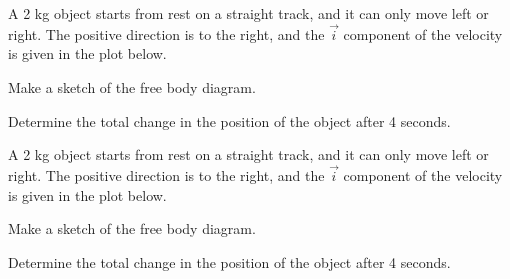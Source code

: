 
\begin{problem}
\item A 2 kg object starts from rest on a straight track, and it can
  only move left or right. The positive direction is to the right, and
  the $\vec{i}$ component of the velocity is given in the plot below.

  \scalebox{0.5}{}

  \begin{subproblem}
    \item Make a sketch of the free body diagram.
      \vspace{4em}
    \item Determine the total change in the position of the object
      after 4 seconds.
      \vfill
  \end{subproblem}
  \clearpage

\item A 2 kg object starts from rest on a straight track, and it can
  only move left or right. The positive direction is to the right, and
  the $\vec{i}$ component of the velocity is given in the plot below.

  \scalebox{0.5}{}

  \begin{subproblem}
    \item Make a sketch of the free body diagram.
      \vspace{4em}
    \item Determine the total change in the position of the object
      after 4 seconds.  
      \vfill
  \end{subproblem}

\end{problem}


